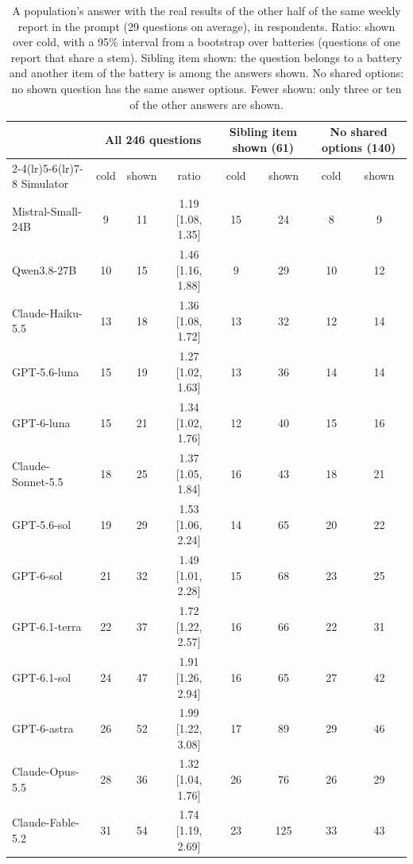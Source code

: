 \begin{table}[h]
\centering\small
\setlength{\tabcolsep}{4pt}
\begin{tabular}{lccccccc}
\toprule
 & \multicolumn{3}{c}{All 246 questions} & \multicolumn{2}{c}{Sibling item shown (61)} & \multicolumn{2}{c}{No shared options (140)} \\
\cmidrule(lr){2-4}\cmidrule(lr){5-6}\cmidrule(lr){7-8}
Simulator & cold & shown & ratio & cold & shown & cold & shown \\
\midrule
Mistral-Small-24B & 9 & 11 & 1.19 {\scriptsize[1.08, 1.35]} & 15 & 24 & 8 & 9 \\
Qwen3.8-27B & 10 & 15 & 1.46 {\scriptsize[1.16, 1.88]} & 9 & 29 & 10 & 12 \\
Claude-Haiku-5.5 & 13 & 18 & 1.36 {\scriptsize[1.08, 1.72]} & 13 & 32 & 12 & 14 \\
GPT-5.6-luna & 15 & 19 & 1.27 {\scriptsize[1.02, 1.63]} & 13 & 36 & 14 & 14 \\
GPT-6-luna & 15 & 21 & 1.34 {\scriptsize[1.02, 1.76]} & 12 & 40 & 15 & 16 \\
Claude-Sonnet-5.5 & 18 & 25 & 1.37 {\scriptsize[1.05, 1.84]} & 16 & 43 & 18 & 21 \\
GPT-5.6-sol & 19 & 29 & 1.53 {\scriptsize[1.06, 2.24]} & 14 & 65 & 20 & 22 \\
GPT-6-sol & 21 & 32 & 1.49 {\scriptsize[1.01, 2.28]} & 15 & 68 & 23 & 25 \\
GPT-6.1-terra & 22 & 37 & 1.72 {\scriptsize[1.22, 2.57]} & 16 & 66 & 22 & 31 \\
GPT-6.1-sol & 24 & 47 & 1.91 {\scriptsize[1.26, 2.94]} & 16 & 65 & 27 & 42 \\
GPT-6-astra & 26 & 52 & 1.99 {\scriptsize[1.22, 3.08]} & 17 & 89 & 29 & 46 \\
Claude-Opus-5.5 & 28 & 36 & 1.32 {\scriptsize[1.04, 1.76]} & 26 & 76 & 26 & 29 \\
Claude-Fable-5.2 & 31 & 54 & 1.74 {\scriptsize[1.19, 2.69]} & 23 & 125 & 33 & 43 \\
\bottomrule
\end{tabular}
\caption{A population's answer with the real results of the other half of the same weekly report in the prompt (29 questions on average), in respondents. Ratio: shown over cold, with a 95\% interval from a bootstrap over batteries (questions of one report that share a stem). Sibling item shown: the question belongs to a battery and another item of the battery is among the answers shown. No shared options: no shown question has the same answer options. Fewer shown: only three or ten of the other answers are shown.}
\label{tab:ctx}
\end{table}
